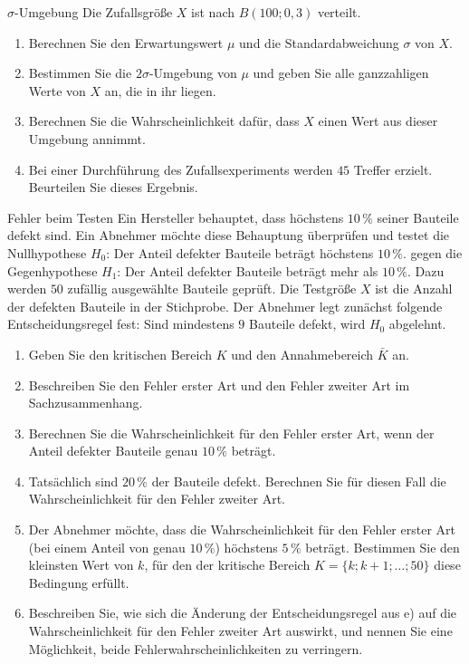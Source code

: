 \begin{uebung}{\texorpdfstring{\(\sigma\)}{Sigma}-Umgebung}
Die Zufallsgröße $X$ ist nach $B(100;0{,}3)$ verteilt.
\begin{enumerate}[label=\alph*)]
  \item Berechnen Sie den Erwartungswert $\mu$ und die Standardabweichung $\sigma$ von $X$.
  \item Bestimmen Sie die $2\sigma$-Umgebung von $\mu$ und geben Sie alle ganzzahligen Werte von $X$ an, die in ihr liegen.
  \item Berechnen Sie die Wahrscheinlichkeit dafür, dass $X$ einen Wert aus dieser Umgebung annimmt.
  \item Bei einer Durchführung des Zufallsexperiments werden $45$ Treffer erzielt. Beurteilen Sie dieses Ergebnis.
\end{enumerate}
\end{uebung}


\begin{uebung}{Fehler beim Testen}
Ein Hersteller behauptet, dass höchstens $10\,\%$ seiner Bauteile defekt sind. Ein Abnehmer möchte diese Behauptung überprüfen und testet die Nullhypothese $H_0$: \glqq Der Anteil defekter Bauteile beträgt höchstens $10\,\%$.\grqq{} gegen die Gegenhypothese $H_1$: \glqq Der Anteil defekter Bauteile beträgt mehr als $10\,\%$.\grqq{} Dazu werden $50$ zufällig ausgewählte Bauteile geprüft. Die Testgröße $X$ ist die Anzahl der defekten Bauteile in der Stichprobe. Der Abnehmer legt zunächst folgende Entscheidungsregel fest: Sind mindestens $9$ Bauteile defekt, wird $H_0$ abgelehnt.
\begin{enumerate}[label=\alph*)]
  \item Geben Sie den kritischen Bereich $K$ und den Annahmebereich $\bar{K}$ an.
  \item Beschreiben Sie den Fehler erster Art und den Fehler zweiter Art im Sachzusammenhang.
  \item Berechnen Sie die Wahrscheinlichkeit für den Fehler erster Art, wenn der Anteil defekter Bauteile genau $10\,\%$ beträgt.
  \item Tatsächlich sind $20\,\%$ der Bauteile defekt. Berechnen Sie für diesen Fall die Wahrscheinlichkeit für den Fehler zweiter Art.
  \item Der Abnehmer möchte, dass die Wahrscheinlichkeit für den Fehler erster Art (bei einem Anteil von genau $10\,\%$) höchstens $5\,\%$ beträgt. Bestimmen Sie den kleinsten Wert von $k$, für den der kritische Bereich $K = \{k; k+1; \ldots; 50\}$ diese Bedingung erfüllt.
  \item Beschreiben Sie, wie sich die Änderung der Entscheidungsregel aus e) auf die Wahrscheinlichkeit für den Fehler zweiter Art auswirkt, und nennen Sie eine Möglichkeit, beide Fehlerwahrscheinlichkeiten zu verringern.
\end{enumerate}
\end{uebung}

